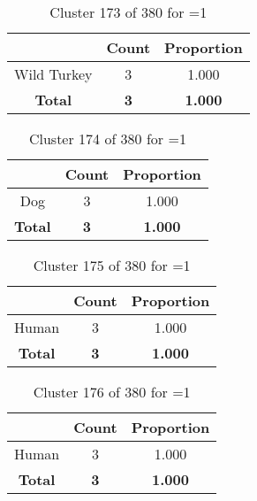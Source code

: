 \begin{table}[ht!]
\centering
\begin{tabular}{|c|c|c|}
\hline
\bf \Spec{} &\bf Count &\bf Proportion\\ \hline \hline
Wild Turkey & 3 & 1.000\\ \hline
\hline
\bf Total & \bf 3 & \bf 1.000\\ \hline
\end{tabular}
\label{tab:cluster:173:1}
\caption{Cluster 173 of 380 for \minneigh{}=1}
\end{table}

\begin{table}[ht!]
\centering
\begin{tabular}{|c|c|c|}
\hline
\bf \Spec{} &\bf Count &\bf Proportion\\ \hline \hline
Dog & 3 & 1.000\\ \hline
\hline
\bf Total & \bf 3 & \bf 1.000\\ \hline
\end{tabular}
\label{tab:cluster:174:1}
\caption{Cluster 174 of 380 for \minneigh{}=1}
\end{table}

\begin{table}[ht!]
\centering
\begin{tabular}{|c|c|c|}
\hline
\bf \Spec{} &\bf Count &\bf Proportion\\ \hline \hline
Human & 3 & 1.000\\ \hline
\hline
\bf Total & \bf 3 & \bf 1.000\\ \hline
\end{tabular}
\label{tab:cluster:175:1}
\caption{Cluster 175 of 380 for \minneigh{}=1}
\end{table}

\begin{table}[ht!]
\centering
\begin{tabular}{|c|c|c|}
\hline
\bf \Spec{} &\bf Count &\bf Proportion\\ \hline \hline
Human & 3 & 1.000\\ \hline
\hline
\bf Total & \bf 3 & \bf 1.000\\ \hline
\end{tabular}
\label{tab:cluster:176:1}
\caption{Cluster 176 of 380 for \minneigh{}=1}
\end{table}


